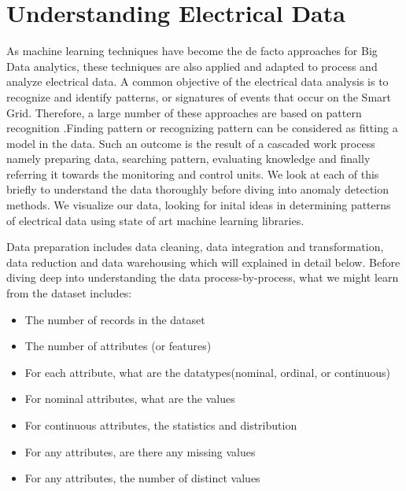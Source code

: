 \chapter{Understanding Electrical Data}
As machine learning techniques have become the de facto approaches for Big Data analytics, these techniques are also applied and adapted to process and analyze electrical data. A common objective of the electrical data analysis is to recognize and identify patterns, or signatures of events that occur on the Smart Grid. Therefore, a large number of these approaches are based on pattern recognition \cite{al2012synchrophasor}.Finding pattern or recognizing pattern can be considered as fitting a model in the data. Such an outcome is the result of a cascaded work process namely preparing data, searching pattern, evaluating knowledge and finally referring it towards the monitoring and control units. We look at each of this briefly to understand the data thoroughly before diving into anomaly detection methods. We visualize our data, looking for inital ideas in determining patterns of electrical data using state of art machine learning libraries. 

Data preparation includes data cleaning, data integration and transformation, data reduction and data warehousing which will explained in detail below. Before diving deep into understanding the data process-by-process, what we might learn from the dataset includes:

\begin{itemize}

  \item The number of records in the dataset
  \item The number of attributes (or features)
  \item For each attribute, what are the datatypes(nominal, ordinal, or continuous)
  \item For nominal attributes, what are the values
  \item For continuous attributes, the statistics and distribution
  \item For any attributes, are there any missing values
  \item For any attributes, the number of distinct values

\end{itemize}

